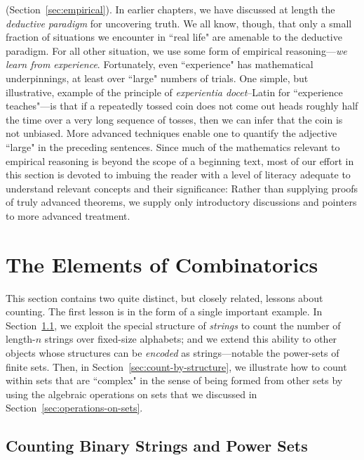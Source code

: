 \medskip

 

 (Section~\ref{sec:empirical}).
In earlier chapters, we have discussed at length the {\em deductive paradigm} for uncovering truth.  We all know, though, that only a small fraction of situations we encounter in ``real life" are amenable to the deductive paradigm.  For all other situation, we use some form of empirical reasoning---{\em we learn from experience}.  Fortunately, even ``experience" has mathematical underpinnings, at least over ``large" numbers of trials.  One simple, but illustrative, example of the principle of {\em experientia docet}--Latin for ``experience teaches"---is that if a repeatedly tossed coin does not come out {\sc head}s roughly half the time over a very long sequence of tosses, then we can infer that the coin is not unbiased.  More advanced techniques enable one to quantify the adjective ``large" in the preceding sentences.  Since much of the mathematics relevant to empirical reasoning is beyond the scope of a beginning text, most of our effort in this section is devoted to imbuing the reader with a level of literacy adequate to understand relevant concepts and their significance:  Rather than supplying proofs of truly advanced theorems, we supply only introductory discussions and pointers to more advanced treatment.

\section{The Elements of Combinatorics}
\label{sec:counting}

This section contains two quite distinct, but closely related, lessons about counting.  The first lesson is in the form of a single important example.  In Section~\ref{sec:b-ary strings}, we exploit the special structure of {\em strings} to count the number of length-$n$ strings over fixed-size alphabets; and we extend this ability to other objects whose structures can be {\em encoded} as strings---notable the power-sets of finite sets.  Then, in Section~\ref{sec:count-by-structure}, we illustrate how to count within sets that are ``complex" in the sense of being formed from other sets by using the algebraic operations on sets that we discussed in Section~\ref{sec:operations-on-sets}.

\subsection{Counting Binary Strings and Power Sets}
\label{sec:b-ary strings}

